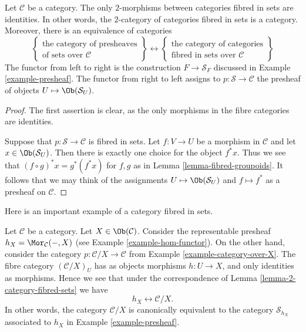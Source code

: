 \begin{lemma}
\label{lemma-2-category-fibred-sets}
Let $\mathcal{C}$ be a category.
The only $2$-morphisms between categories fibred in sets are identities.
In other words, the $2$-category of categories fibred in sets is a category.
Moreover, there is an equivalence of categories
$$
\left\{
\begin{matrix}
\text{the category of presheaves}\\
\text{of sets over }\mathcal{C}
\end{matrix}
\right\}
\leftrightarrow
\left\{
\begin{matrix}
\text{the category of categories}\\
\text{fibred in sets over }\mathcal{C}
\end{matrix}
\right\}
$$
The functor from left to right is the construction
$F \to \mathcal{S}_F$ discussed in
Example \ref{example-presheaf}.
The functor from right to left assigns to $p : \mathcal{S} \to \mathcal{C}$
the presheaf of objects $U \mapsto \Ob(\mathcal{S}_U)$.
\end{lemma}

\begin{proof}
The first assertion is clear, as the only morphisms in the fibre
categories are identities.

\medskip\noindent
Suppose that $p :
\mathcal{S} \to \mathcal{C}$ is fibred in sets. Let $f : V \to U$
be a morphism in $\mathcal{C}$ and let $x \in \Ob(\mathcal{S}_U)$.
Then there is exactly one choice for the object $f^\ast x$. Thus we see that
$(f \circ g)^\ast x = g^\ast(f^\ast x)$ for $f, g$ as in Lemma
\ref{lemma-fibred-groupoids}. It follows that we may think of the
assignments $U \mapsto \Ob(\mathcal{S}_U)$ and $f \mapsto f^\ast$
as a presheaf on $\mathcal{C}$.
\end{proof}

\noindent
Here is an important example of a category fibred in sets.

\begin{example}
\label{example-fibred-category-from-functor-of-points}
Let $\mathcal{C}$ be a category. Let $X \in \Ob(\mathcal{C})$.
Consider the representable presheaf $h_X = \Mor_\mathcal{C}(-, X)$
(see Example \ref{example-hom-functor}).
On the other hand, consider the category $p : \mathcal{C}/X \to \mathcal{C}$
from Example \ref{example-category-over-X}.
The fibre category $(\mathcal{C}/X)_U$ has as objects morphisms
$h : U \to X$, and only identities as morphisms. Hence we see that
under the correspondence of
Lemma \ref{lemma-2-category-fibred-sets}
we have
$$
h_X \longleftrightarrow \mathcal{C}/X.
$$
In other words, the category $\mathcal{C}/X$ is canonically equivalent
to the category $\mathcal{S}_{h_X}$ associated
to $h_X$ in
Example \ref{example-presheaf}.
\end{example}

